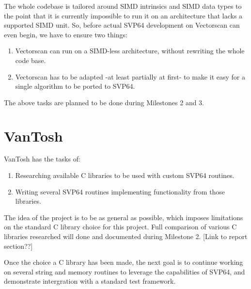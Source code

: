 The whole codebase is tailored around SIMD intrinsics and SIMD data types to
the point that it is currently impossible to run it on an architecture that
lacks a supported SIMD unit. So, before actual SVP64 development on Vectorscan
can even begin, we have to ensure two things:

\begin{enumerate}
  \item Vectorscan can run on a SIMD-less architecture, without rewriting
   the whole code base.
  \item Vectorscan has to be adapted -at least partially at first- to make it easy
   for a single algorithm to be ported to SVP64.
\end{enumerate}

The above tasks are planned to be done during Milestones 2 and 3.

\section{VanTosh}

VanTosh has the tasks of:

\begin{enumerate}
  \item Researching available C libraries to be used with custom SVP64 routines.
  \item Writing several SVP64 routines implementing functionality from those libraries.
\end{enumerate}

The idea of the project is to be as general as possible, which imposes limitations
on the standard C library choice for this project. Full comparison of various
C libraries researched will done and documented during Milestone 2.
[Link to report section??]

Once the choice a C library has been made, the next goal is to continue working on
several string and memory routines to leverage the capabilities of SVP64,
and demonstrate intergration with a standard test framework.
